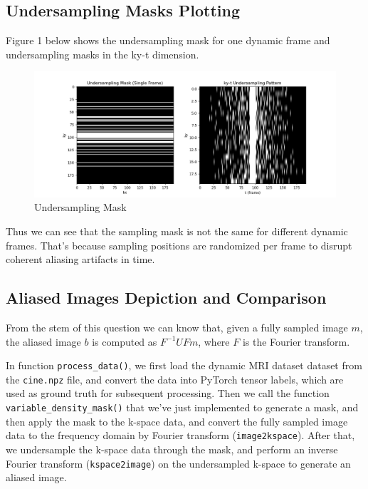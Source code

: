 \documentclass{article}
\begin{document}
\subsection{Undersampling Masks Plotting}
Figure 1 below shows the undersampling mask for one dynamic frame and undersampling masks in the ky-t dimension.

\begin{figure}[ht]
  \centering
  \includegraphics[width=\linewidth]{../assets/undersampling_mask.png}
  \caption{Undersampling Mask}
  \label{fig:undersampling mask for one dynamic frame and undersampling masks in the ky-t dimension}
\end{figure}

Thus we can see that the sampling mask is not the same for different dynamic frames.
That's because sampling positions are randomized per frame to disrupt coherent aliasing artifacts in time.

\subsection{Aliased Images Depiction and Comparison}
From the stem of this question we can know that, given a fully sampled image $m$,
the aliased image $b$ is computed as $F^{-1} U F m$, where $F$ is the Fourier transform.

In function \texttt{process\_data()}, we first load the dynamic MRI dataset dataset from the \texttt{cine.npz} file,
and convert the data into PyTorch tensor labels, which are used as ground truth for subsequent processing. Then we
call the function \texttt{variable\_density\_mask()} that we've just implemented to generate a mask,
and then apply the mask to the k-space data, and convert the fully sampled image data to the frequency
domain by Fourier transform (\texttt{image2kspace}). After that, we undersample the k-space data through the mask,
and perform an inverse Fourier transform (\texttt{kspace2image}) on the undersampled k-space to generate an aliased image.
\end{document}
